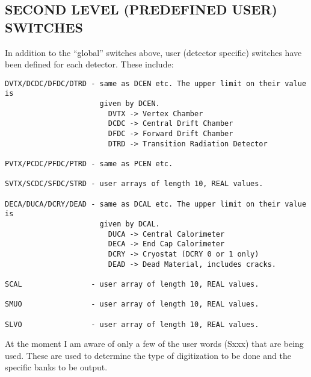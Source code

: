 \subsection{SECOND LEVEL (PREDEFINED USER) SWITCHES}

In addition to the ``global'' switches above, user (detector specific)
switches have been defined for each detector.  These include:

\begin{verbatim}
DVTX/DCDC/DFDC/DTRD - same as DCEN etc. The upper limit on their value is 
                      given by DCEN.
                        DVTX -> Vertex Chamber
                        DCDC -> Central Drift Chamber
                        DFDC -> Forward Drift Chamber
                        DTRD -> Transition Radiation Detector

PVTX/PCDC/PFDC/PTRD - same as PCEN etc.

SVTX/SCDC/SFDC/STRD - user arrays of length 10, REAL values.

DECA/DUCA/DCRY/DEAD - same as DCAL etc. The upper limit on their value is
                      given by DCAL.
                        DUCA -> Central Calorimeter
                        DECA -> End Cap Calorimeter
                        DCRY -> Cryostat (DCRY 0 or 1 only)
                        DEAD -> Dead Material, includes cracks.

SCAL                - user array of length 10, REAL values.

SMUO                - user array of length 10, REAL values.

SLVO                - user array of length 10, REAL values.
\end{verbatim}

At the moment I am aware of only a few of the user words (Sxxx) that are being
used. These are used to determine the type of digitization to be done and the
specific banks to be output.

